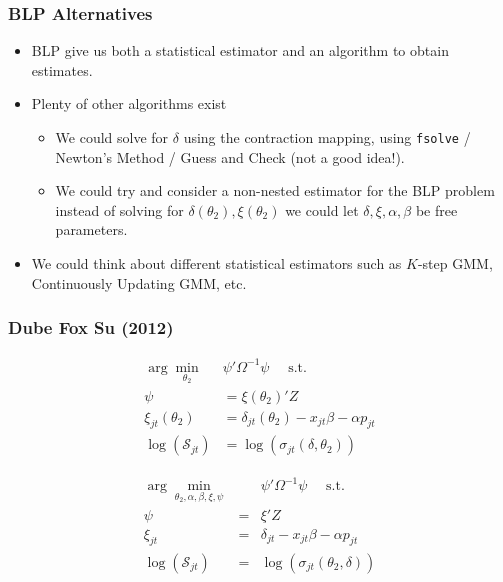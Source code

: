  \begin{frame}
\frametitle{BLP Alternatives}
\begin{itemize}
 \item BLP give us both a statistical \alert{estimator} and an \alert{algorithm} to obtain estimates.
\item Plenty of other algorithms exist
\begin{itemize}
\item We could solve for $\delta$ using the contraction mapping, using \texttt{fsolve} / Newton's Method / Guess and Check (not a good idea!).
\item We could try and consider a non-nested estimator for the BLP problem instead of solving for $\delta(\theta_2),\xi(\theta_2)$ we could let $\delta,\xi,\alpha,\beta$ be free parameters.
 \end{itemize}
\item We could think about different statistical estimators such as $K$-step GMM, Continuously Updating GMM, etc.
 \end{itemize}
\end{frame}


 \begin{frame}\frametitle{Dube Fox Su (2012)}
\footnotesize
\begin{align}
\label{blpnfxp}
\nonumber \arg \min_{\theta_2} & \psi' \Omega^{-1} \psi \quad \mbox{ s.t. } \\
\nonumber \psi &= \xi(\theta_2)' Z\\
\xi_{jt}(\theta_2) &= \delta_{jt}(\theta_2) - x_{jt} \beta - \alpha p_{jt} \\
\nonumber \log(\mathcal{S}_{jt})  &= \log(\sigma_{jt}(\delta,\theta_2))
\end{align}

\begin{eqnarray}
\label{blpmpec}
\nonumber \arg \min_{\theta_2,\alpha,\beta, \xi,\psi} && \psi' \Omega^{-1}  \psi \quad \mbox{ s.t. } \\
 \psi &=& \xi' Z\\
\nonumber \xi_{jt} &=& \delta_{jt} - x_{jt} \beta - \alpha p_{jt} \\
\nonumber \log(\mathcal{S}_{jt})  &=& \log(\sigma_{jt}(\theta_2, \delta))
\end{eqnarray}
\end{frame}

